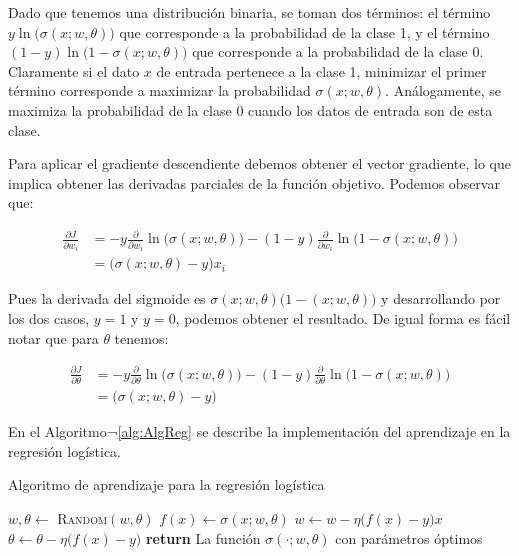 Dado que tenemos una distribución binaria, se toman dos términos: el término $y \ln\big( \sigma(x; w, \theta)\big)$ que corresponde a la probabilidad de la clase 1, y el término $(1-y) \ln\big( 1-\sigma(x; w, \theta)\big)$ que corresponde a la probabilidad de la clase 0. Claramente si el dato $x$ de entrada pertenece a la clase 1, minimizar el primer término corresponde a maximizar la probabilidad $\sigma(x; w, \theta)$. Análogamente, se maximiza la probabilidad de la clase 0 cuando los datos de entrada son de esta clase.

Para aplicar el gradiente descendiente debemos obtener el vector gradiente, lo que implica obtener las derivadas parciales de la función objetivo. Podemos observar que:

\begin{align*}
    \frac{\partial J }{\partial w_i} &= - y \frac{\partial}{\partial w_i} \ln\big( \sigma(x; w, \theta)\big) - (1- y) \frac{\partial }{\partial w_i}  \ln\big( 1-\sigma(x; w, \theta) \big) \\
        &= \big( \sigma(x; w, \theta) - y \big) x_i 
\end{align*}

Pues la derivada del sigmoide es $\sigma(x; w, \theta)\big(1-(x; w, \theta)\big)$ y desarrollando por los dos casos, $y=1$ y $y=0$, podemos obtener el resultado. De igual forma es fácil notar que para $\theta$ tenemos:

\begin{align*}
    \frac{\partial J }{\partial \theta} &= - y \frac{\partial}{\partial \theta} \ln\big( \sigma(x; w, \theta)\big) - (1- y) \frac{\partial }{\partial \theta}  \ln\big( 1-\sigma(x; w, \theta) \big) \\
        &= \big( \sigma(x; w, \theta) - y \big)
\end{align*}

En el Algoritmo¬\ref{alg:AlgReg} se describe la implementación del aprendizaje en la regresión logística.


\begin{algorithm}
 \caption{Algoritmo de aprendizaje para la regresión logística}\label{alg:AlgReg}
 \begin{algorithmic}
    \State $w, \theta \leftarrow$ \textsc{Random}$(w, \theta)$
            \State $f(x) \leftarrow \sigma(x; w, \theta) $
            \State $w \leftarrow w - \eta \big( f(x) - y \big) x $
            \State $\theta \leftarrow \theta - \eta \big( f(x) - y \big) $
        \EndFor
    \EndFor
    \State \textbf{return} La función $\sigma(\cdot; w, \theta)$ con parámetros óptimos
  \EndFunction
 \end{algorithmic}
\end{algorithm}

